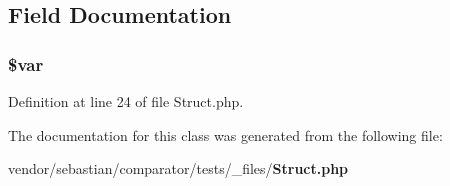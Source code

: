 \subsection{Field Documentation}
\subsubsection[{\$var}]{\setlength{\rightskip}{0pt plus 5cm}\$var}\label{class_sebastian_bergmann_1_1_comparator_1_1_struct_a9184c9cf1f1e58b87296500a3c3a9291}


Definition at line 24 of file Struct.\+php.



The documentation for this class was generated from the following file\+:\begin{DoxyCompactItemize}
\item 
vendor/sebastian/comparator/tests/\+\_\+files/{\bf Struct.\+php}\end{DoxyCompactItemize}
